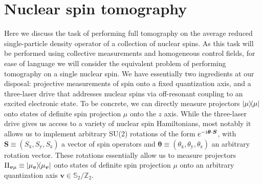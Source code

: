 \documentclass[nofootinbib,notitlepage,11pt]{revtex4-2}
\newcommand{\p}[1]{\left(#1\right)} %
\renewcommand{\v}{\bm} %
\renewcommand{\c}{\cdot} %
\renewcommand{\i}{\mathrm{i}\mkern1mu} %
\newcommand{\1}{\mathds{1}}
\newcommand{\x}{\text{x}}
\newcommand{\y}{\text{y}}
\newcommand{\z}{\text{z}}
\renewcommand{\SS}{\mathbb{S}}
\newcommand{\ZZ}{\mathbb{Z}}
\begin{document}
\newpage
\section{Nuclear spin tomography}

Here we discuss the task of performing full tomography on the average reduced single-particle density operator of a collection of nuclear spins.
As this task will be performed using collective measurements and homogeneous control fields, for ease of language we will consider the equivalent problem of performing tomography on a single nuclear spin.
We have essentially two ingredients at our disposal: projective measurements of spin onto a fixed quantization axis, and a three-laser drive that addresses nuclear spins via off-resonant coupling to an excited electronic state.
To be concrete, we can directly measure projectors $\op{\mu}$ onto states of definite spin projection $\mu$ onto the $z$ axis.
While the three-laser drive gives us access to a variety of nuclear spin Hamiltonians, most notably it allows us to implement arbitrary SU(2) rotations of the form $e^{-\i\v\theta\c\v S}$, with $\v S\equiv\p{S_\x,S_\y,S_\z}$ a vector of spin operators and $\v\theta\equiv\p{\theta_\x,\theta_\y,\theta_\z}$ an arbitrary rotation vector.
These rotations essentially allow us to measure projectors $\Pi_{\v v\mu} \equiv \op{\mu_{\v v}}$ onto states of definite spin projection $\mu$ onto an arbitrary quantization axis $\v v\in\SS_2/\ZZ_2$.
\end{document}
